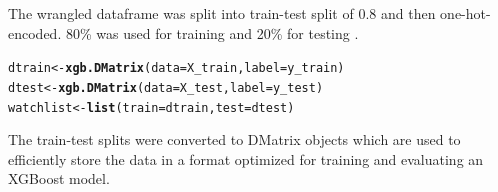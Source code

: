 \documentclass{article}\usepackage[]{graphicx}\usepackage[]{xcolor}
\makeatletter
\newcommand{\hldef}[1]{\textcolor[rgb]{0.345,0.345,0.345}{#1}}%
\newcommand{\hlkwb}[1]{\textcolor[rgb]{0.69,0.353,0.396}{#1}}%
\newcommand{\hlkwc}[1]{\textcolor[rgb]{0.333,0.667,0.333}{#1}}%
\newcommand{\hlkwd}[1]{\textcolor[rgb]{0.737,0.353,0.396}{\textbf{#1}}}%
\newenvironment{kframe}{%
 \def\at@end@of@kframe{}%
 \ifinner\ifhmode%
  \def\at@end@of@kframe{\end{minipage}}%
  \begin{minipage}{\columnwidth}%
 \fi\fi%
 \def\FrameCommand##1{\hskip\@totalleftmargin \hskip-\fboxsep
 \colorbox{shadecolor}{##1}\hskip-\fboxsep
     \hskip-\linewidth \hskip-\@totalleftmargin \hskip\columnwidth}%
 \MakeFramed {\advance\hsize-\width
   \@totalleftmargin\z@ \linewidth\hsize
   \@setminipage}}%
 {\par\unskip\endMakeFramed%
 \at@end@of@kframe}
\newenvironment{knitrout}{}{} %
\makeatother
\begin{document}
The wrangled dataframe was split into train-test split of 0.8 and then one-hot-encoded. 80\% was used for training and 20\% for testing . \\

\begin{knitrout}
\color{fgcolor}\begin{kframe}
\begin{alltt}
\hldef{dtrain} \hlkwb{<-} \hlkwd{xgb.DMatrix}\hldef{(}\hlkwc{data} \hldef{= X_train,} \hlkwc{label}\hldef{=y_train)}
\hldef{dtest} \hlkwb{<-} \hlkwd{xgb.DMatrix}\hldef{(}\hlkwc{data} \hldef{= X_test,} \hlkwc{label}\hldef{=y_test)}
\hldef{watchlist} \hlkwb{<-} \hlkwd{list}\hldef{(}\hlkwc{train}\hldef{=dtrain,} \hlkwc{test}\hldef{=dtest)}
\end{alltt}
\end{kframe}
\end{knitrout}

The train-test splits were converted to DMatrix objects which are used to efficiently store the data in a format optimized for training and evaluating an XGBoost model. \\
\end{document}
